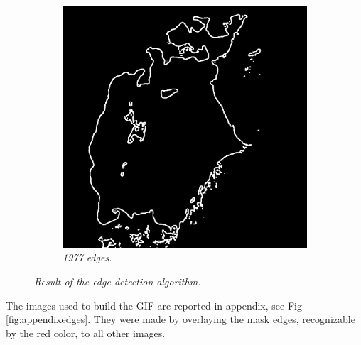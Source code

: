 \begin{figure}[H]
\begin{subfigure}[b]{.45\textwidth}
        \includegraphics[width=\textwidth]{../img/1977_edge_red.jpg}
        \caption{\emph{1977 edges.}}
    \end{subfigure}
    \caption{\emph{Result of the edge detection algorithm.}}
    \label{fig:edges}
\end{figure}
The images used to build the GIF are reported in appendix, see Fig \ref{fig:appendixedges}.
They were made by overlaying the mask edges, recognizable by the red color, to all other images.
